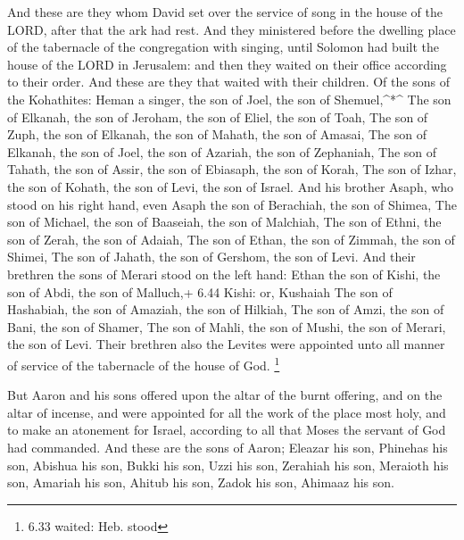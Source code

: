  And these are they whom David set over the service of song
in the house of the LORD, after that the ark had rest.  And
they ministered before the dwelling place of the tabernacle of the
congregation with singing, until Solomon had built the house of the LORD
in Jerusalem: and then they waited on their office according to their
order.  And these are they that waited with their children.
Of the sons of the Kohathites: Heman a singer, the son of Joel, the son
of Shemuel,\^{}*\^{}  The son of Elkanah, the son of
Jeroham, the son of Eliel, the son of Toah,  The son of
Zuph, the son of Elkanah, the son of Mahath, the son of Amasai,
 The son of Elkanah, the son of Joel, the son of Azariah,
the son of Zephaniah,  The son of Tahath, the son of Assir,
the son of Ebiasaph, the son of Korah,  The son of Izhar,
the son of Kohath, the son of Levi, the son of Israel.  And
his brother Asaph, who stood on his right hand, even Asaph the son of
Berachiah, the son of Shimea,  The son of Michael, the son
of Baaseiah, the son of Malchiah,  The son of Ethni, the
son of Zerah, the son of Adaiah,  The son of Ethan, the son
of Zimmah, the son of Shimei,  The son of Jahath, the son
of Gershom, the son of Levi.  And their brethren the sons
of Merari stood on the left hand: Ethan the son of Kishi, the son of
Abdi, the son of Malluch,+ 6.44 Kishi: or, Kushaiah  The
son of Hashabiah, the son of Amaziah, the son of Hilkiah, 
The son of Amzi, the son of Bani, the son of Shamer,  The
son of Mahli, the son of Mushi, the son of Merari, the son of Levi.
 Their brethren also the Levites were appointed unto all
manner of service of the tabernacle of the house of God. \footnote{6.33
  waited: Heb. stood}

 But Aaron and his sons offered upon the altar of the burnt
offering, and on the altar of incense, and were appointed for all the
work of the place most holy, and to make an atonement for Israel,
according to all that Moses the servant of God had commanded.
 And these are the sons of Aaron; Eleazar his son, Phinehas
his son, Abishua his son,  Bukki his son, Uzzi his son,
Zerahiah his son,  Meraioth his son, Amariah his son,
Ahitub his son,  Zadok his son, Ahimaaz his son.

